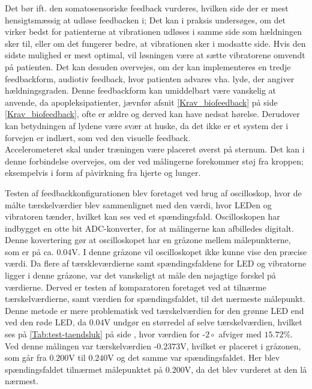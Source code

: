 Det bør ift. den somatosensoriske feedback vurderes, hvilken side der er mest hensigtsmæssig at udløse feedbacken i; Det kan i praksis undersøges, om det virker bedst for patienterne at vibrationen udløses i samme side som hældningen sker til, eller om det fungerer bedre, at vibrationen sker i modsatte side. Hvis den sidste mulighed er mest optimal, vil løsningen være at sætte vibratorene omvendt på patienten. 
Det kan desuden overvejes, om der kan implementeres en tredje feedbackform, audiotiv feedback, hvor patienten advares vha. lyde, der angiver hældningsgraden. Denne feedbackform kan umiddelbart være vanskelig at anvende, da apopleksipatienter, jævnfør afsnit \ref{Krav_biofeedback} på side \ref{Krav_biofeedback}, ofte er ældre og derved kan have nedsat hørelse. Derudover kan betydningen af lydene være svær at huske, da det ikke er et system der i forvejen er indlært, som ved den visuelle feedback. \\
Accelerometeret skal under træningen være placeret øverst på sternum. Det kan i denne forbindelse overvejes, om der ved målingerne forekommer støj fra kroppen; eksempelvis i form af påvirkning fra hjerte og lunger.

Testen af feedbackkonfigurationen blev foretaget ved brug af oscilloskop, hvor de målte tærskelværdier blev sammenlignet med den værdi, hvor LEDen og vibratoren tænder, hvilket kan ses ved et spændingsfald. Oscilloskopen har indbygget en otte bit ADC-konverter, for at målingerne kan afbilledes digitalt. Denne kovertering gør at oscilloskopet har en gråzone mellem målepunkterne, som er på ca. $0.04$V. I denne gråzone vil oscilloskopet ikke kunne vise den præcise værdi. Da flere af tærskleværdierne samt spændingsfaldene for LED og vibratorne ligger i denne gråzone, var det vanskeligt at måle den nøjagtige forskel på værdierne. Derved er testen af komparatoren foretaget ved at tilnærme tærskelværdierne, samt værdien for spændingsfaldet, til det nærmeste målepunkt. Denne metode er mere problematisk ved tærskelværdien for den grønne LED end ved den røde LED, da $0.04$V undgør en størredel af selve tærskelværdien, hvilket ses på \ref{Tab:test-taendsluk}  på side \pageref{Tab:test-taendsluk}, hvor værdien for -$2\circ$ afviger med $15.72$\%. Ved denne målingen var tærskelværdien -$0.2373$V, hvilket er placeret i gråzonen, som går fra $0.200$V til $0.240$V og det samme var spændingsfaldet. Her blev spændingsfaldet tilnærmet målepunktet på $0.200$V, da det blev vurderet at den lå nærmest. 

